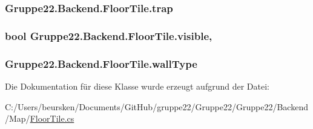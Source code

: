 \hypertarget{class_gruppe22_1_1_backend_1_1_floor_tile_a1f5554db761650899c2fdd571ceff000}{
\subsubsection[{trap}]{ Gruppe22.\-Backend.\-Floor\-Tile.\-trap\hspace{0.3cm}{\ttfamily [get]}}}\label{class_gruppe22_1_1_backend_1_1_floor_tile_a1f5554db761650899c2fdd571ceff000}
\hypertarget{class_gruppe22_1_1_backend_1_1_floor_tile_a285da5ca4d7d6a6af58fff71c1156a91}{
\subsubsection[{visible}]{\setlength{\rightskip}{0pt plus 5cm}bool Gruppe22.\-Backend.\-Floor\-Tile.\-visible\hspace{0.3cm}{\ttfamily [get]}, {\ttfamily [set]}}}\label{class_gruppe22_1_1_backend_1_1_floor_tile_a285da5ca4d7d6a6af58fff71c1156a91}
\hypertarget{class_gruppe22_1_1_backend_1_1_floor_tile_af235974bebb657c12a310521c1e8293d}{
\subsubsection[{wall\-Type}]{ Gruppe22.\-Backend.\-Floor\-Tile.\-wall\-Type\hspace{0.3cm}{\ttfamily [get]}}}\label{class_gruppe22_1_1_backend_1_1_floor_tile_af235974bebb657c12a310521c1e8293d}


Die Dokumentation für diese Klasse wurde erzeugt aufgrund der Datei\-:\begin{DoxyCompactItemize}
\item 
C\-:/\-Users/beursken/\-Documents/\-Git\-Hub/gruppe22/\-Gruppe22/\-Gruppe22/\-Backend/\-Map/\hyperlink{_floor_tile_8cs}{Floor\-Tile.\-cs}\end{DoxyCompactItemize}
